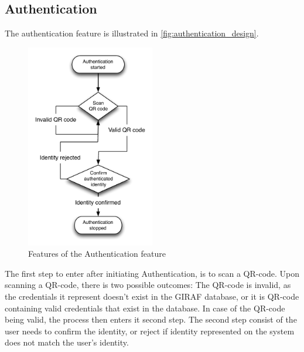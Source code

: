 \subsection{Authentication}
\label{design:authentication}
The authentication feature is illustrated in \autoref{fig:authentication_design}. 
\begin{figure}[h]
	\centering
	\includegraphics[width=0.5\textwidth]{gfx/authentication_design.pdf}
	\caption{Features of the Authentication feature}
	\label{fig:authentication_design}
\end{figure}
The first step to enter after initiating Authentication, is to scan a QR-code.
Upon scanning a QR-code, there is two possible outcomes: The QR-code is invalid, as the credentials it represent doesn't exist in the GIRAF database, or it is QR-code containing valid credentials that exist in the database.
In case of the QR-code being valid, the process then enters it second step. The second step consist of the user needs to confirm the identity, or reject if identity represented on the system does not match the user's identity. 

